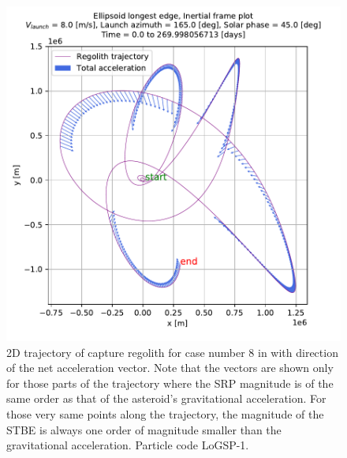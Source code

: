 \FloatBarrier
\begin{figure}[htb]
\centering
\captionsetup{justification=centering}
\includegraphics[width=\linewidth, height=0.45\textheight, keepaspectratio=true]{longest_edge_perturbations/3.2Density_1cmSize/8ms_165Azimuth_45SolarPhase/netAcceleration_vectors.pdf}
\caption{2D trajectory of capture regolith for case number 8 in  with direction of the net acceleration vector. Note that the vectors are shown only for those parts of the trajectory where the \gls{SRP} magnitude is of the same order as that of the asteroid's gravitational acceleration. For those very same points along the trajectory, the magnitude of the \gls{STBE} is always one order of magnitude smaller than the gravitational acceleration. Particle code LoGSP-1.}
\label{fig:LoGSP_1_capture_case_8_2d_totalAccelerationVector}
\end{figure}
\FloatBarrier
